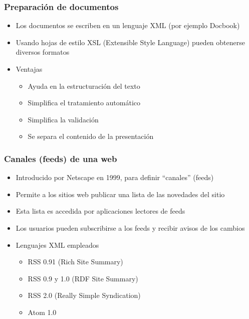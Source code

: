 \begin{frame}
\frametitle{Preparación de documentos}

\begin{itemize}
\item Los documentos se escriben en un lenguaje XML (por ejemplo 
   Docbook)
\item Usando hojas de estilo XSL (Extensible Style Language) 
  pueden obtenerse diversos formatos
\item Ventajas
  \begin{itemize}
  \item Ayuda en la estructuración del texto
  \item Simplifica el tratamiento automático
  \item Simplifica la validación
  \item Se separa el contenido de la presentación
  \end{itemize}
\end{itemize}

\end{frame}


\begin{frame}
\frametitle{Canales (feeds) de una web}

\begin{itemize}
\item Introducido por Netscape en 1999, para definir ``canales'' (feeds)
\item Permite a los sitios web publicar una lista de las novedades del sitio
\item Esta lista es accedida por aplicaciones lectores de feeds
\item Los usuarios pueden subscribirse a los feeds y recibir avisos de los cambios
\item Lenguajes XML empleados
  \begin{itemize}
  \item RSS 0.91 (Rich Site Summary)
  \item RSS 0.9 y 1.0 (RDF Site Summary)
  \item RSS 2.0 (Really Simple Syndication)
  \item Atom 1.0
  \end{itemize}
\end{itemize}

\end{frame}


